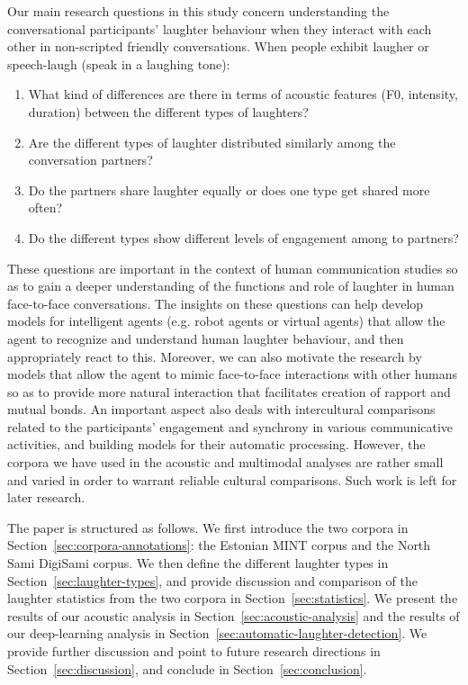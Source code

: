 \documentclass[10pt,journal,compsoc]{IEEEtran}
\begin{document}
Our main research questions in this study concern understanding the conversational participants' laughter behaviour when they interact with each other in non-scripted friendly conversations. When people exhibit laugher or speech-laugh (speak in a laughing tone):

\begin{enumerate}
\item What kind of differences are there in terms of acoustic features (F0, intensity, duration) between the different types of laughters?
\item Are the different types of laughter distributed similarly among the conversation partners?
\item Do the partners share laughter equally or does one type get shared more often?
\item Do the different types show different levels of engagement among to partners?
\end{enumerate}

These questions are important in the context of human communication studies so as to gain a deeper understanding of the functions and role of laughter in human face-to-face conversations. The insights on these questions can help develop models for intelligent agents (e.g. robot agents or virtual agents) that allow the agent to recognize and understand human laughter behaviour, and then appropriately react to this. Moreover, we can also motivate the research by models that allow the agent to mimic face-to-face interactions with other humans so as to provide more natural interaction that facilitates creation of rapport and mutual bonds.
An important aspect also deals with intercultural comparisons related to the participants' engagement and synchrony in various communicative activities, and building models for their automatic processing. However, the corpora we have used in the acoustic and multimodal analyses are rather small and varied in order to warrant reliable cultural comparisons. Such work is left for later research.

The paper is structured as follows.
We first introduce the two corpora in Section~\ref{sec:corpora-annotations}:
the Estonian MINT corpus and the North Sami DigiSami corpus.
We then define the different laughter types in Section~\ref{sec:laughter-types},
and provide discussion and comparison of the laughter statistics from the two corpora
in Section~\ref{sec:statistics}.
We present the results of our acoustic analysis in Section~\ref{sec:acoustic-analysis}
and the results of our deep-learning analysis in Section~\ref{sec:automatic-laughter-detection}.
We provide further discussion and point to future research directions in Section~\ref{sec:discussion},
and conclude in Section~\ref{sec:conclusion}.
\end{document}
